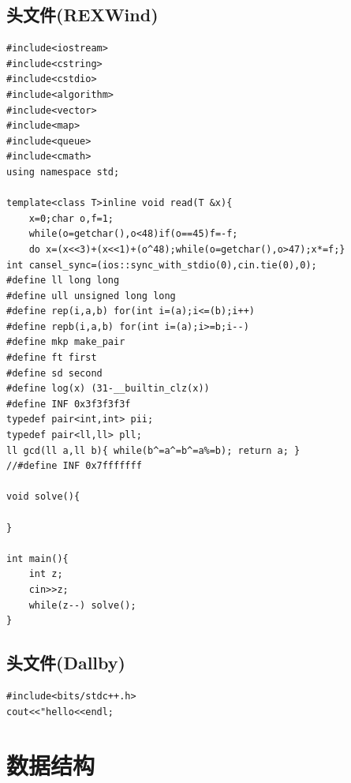 \documentclass[a4]{ctexart}
\begin{document}
\subsection{头文件(REXWind)}
\begin{lstlisting}
#include<iostream>
#include<cstring>
#include<cstdio>
#include<algorithm>
#include<vector>
#include<map>
#include<queue>
#include<cmath>
using namespace std;

template<class T>inline void read(T &x){
	x=0;char o,f=1;
	while(o=getchar(),o<48)if(o==45)f=-f;
	do x=(x<<3)+(x<<1)+(o^48);while(o=getchar(),o>47);x*=f;}
int cansel_sync=(ios::sync_with_stdio(0),cin.tie(0),0);
#define ll long long
#define ull unsigned long long
#define rep(i,a,b) for(int i=(a);i<=(b);i++)
#define repb(i,a,b) for(int i=(a);i>=b;i--)
#define mkp make_pair
#define ft first
#define sd second
#define log(x) (31-__builtin_clz(x))
#define INF 0x3f3f3f3f
typedef pair<int,int> pii;
typedef pair<ll,ll> pll;
ll gcd(ll a,ll b){ while(b^=a^=b^=a%=b); return a; }
//#define INF 0x7fffffff

void solve(){
	
}

int main(){
	int z;
	cin>>z;
	while(z--) solve();
}
\end{lstlisting}
\subsection{头文件(Dallby)}
\begin{lstlisting}
#include<bits/stdc++.h>
cout<<"hello<<endl;
\end{lstlisting}

\section{数据结构}
\end{document}
